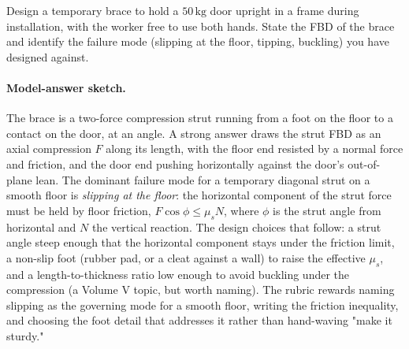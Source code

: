 \begin{exercise}
Design a temporary brace to hold a $50\,\si{\kilogram}$ door upright
in a frame during installation, with the worker free to use both
hands. State the FBD of the brace and identify the failure mode
(slipping at the floor, tipping, buckling) you have designed
against.
\paragraph{Model-answer sketch.} The brace is a two-force compression
strut running from a foot on the floor to a contact on the door, at an
angle. A strong answer draws the strut FBD as an axial compression $F$
along its length, with the floor end resisted by a normal force and
friction, and the door end pushing horizontally against the door's
out-of-plane lean. The dominant failure mode for a temporary diagonal
strut on a smooth floor is \emph{slipping at the floor}: the horizontal
component of the strut force must be held by floor friction, $F\cos\phi
\le \mu_s N$, where $\phi$ is the strut angle from horizontal and $N$ the
vertical reaction. The design choices that follow: a strut angle steep
enough that the horizontal component stays under the friction limit, a
non-slip foot (rubber pad, or a cleat against a wall) to raise the
effective $\mu_s$, and a length-to-thickness ratio low enough to avoid
buckling under the compression (a Volume V topic, but worth naming). The
rubric rewards naming slipping as the governing mode for a smooth floor,
writing the friction inequality, and choosing the foot detail that
addresses it rather than hand-waving "make it sturdy."
\end{exercise}

